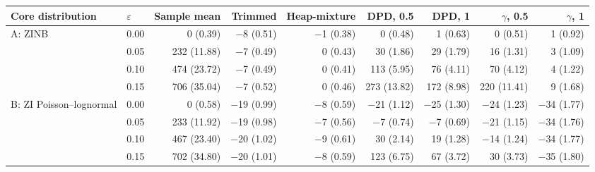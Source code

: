 \begin{tabular}{llrrrrrrr}
\toprule
Core distribution & $\varepsilon$ & Sample mean & Trimmed & Heap-mixture & DPD, 0.5 & DPD, 1 & $\gamma$, 0.5 & $\gamma$, 1 \\
\midrule
A: ZINB & 0.00 & 0 (0.39) & $-$8 (0.51) & $-$1 (0.38) & 0 (0.48) & 1 (0.63) & 0 (0.51) & 1 (0.92) \\
 & 0.05 & 232 (11.88) & $-$7 (0.49) & 0 (0.43) & 30 (1.86) & 29 (1.79) & 16 (1.31) & 3 (1.09) \\
 & 0.10 & 474 (23.72) & $-$7 (0.49) & 0 (0.41) & 113 (5.95) & 76 (4.11) & 70 (4.12) & 4 (1.22) \\
 & 0.15 & 706 (35.04) & $-$7 (0.52) & 0 (0.46) & 273 (13.82) & 172 (8.98) & 220 (11.41) & 9 (1.68) \\
\addlinespace
B: ZI Poisson--lognormal & 0.00 & 0 (0.58) & $-$19 (0.99) & $-$8 (0.59) & $-$21 (1.12) & $-$25 (1.30) & $-$24 (1.23) & $-$34 (1.77) \\
 & 0.05 & 233 (11.92) & $-$19 (0.98) & $-$7 (0.56) & $-$7 (0.74) & $-$7 (0.69) & $-$21 (1.15) & $-$34 (1.76) \\
 & 0.10 & 467 (23.40) & $-$20 (1.02) & $-$9 (0.61) & 30 (2.14) & 19 (1.28) & $-$14 (1.24) & $-$34 (1.77) \\
 & 0.15 & 702 (34.80) & $-$20 (1.01) & $-$8 (0.59) & 123 (6.75) & 67 (3.72) & 30 (3.73) & $-$35 (1.80) \\
\bottomrule
\end{tabular}

